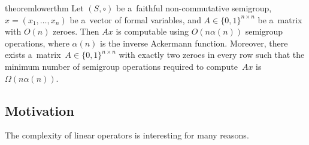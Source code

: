 \documentclass[review,onefignum,onetabnum]{siamart190516}
\begin{document}
\begin{restatable}{theorem}{lowerthm}
\label{thm:lowerbound}
Let $(S, \circ)$ be a~faithful non-commutative semigroup, $x = (x_1,\ldots, x_n)$ be
a~vector of formal variables, and $A \in \{0,1\}^{n \times n}$
be a~matrix with $O(n)$ zeroes. Then $Ax$ is computable
using $O(n\alpha(n))$ semigroup operations, where $\alpha(n)$
is the inverse Ackermann function. Moreover, there exists
a~matrix~$A \in \{0,1\}^{n \times n}$ with exactly two zeroes
in every row such that the minimum number of semigroup
operations
required to compute~$Ax$ is $\Omega(n\alpha(n))$.
\end{restatable}


\subsection{Motivation}
The complexity of linear operators is interesting for many reasons.
\end{document}
